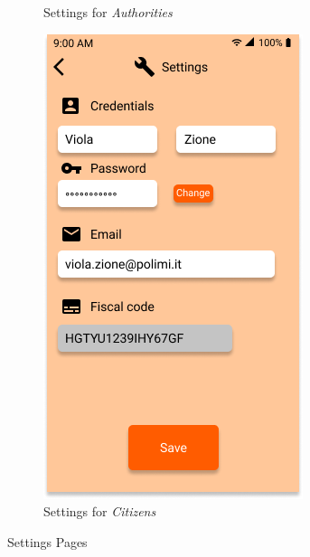 \documentclass{article}
\begin{document}
\begin{figure}[H]
\begin{subfigure}{0.5\textwidth}
        \caption{Settings for \textit{Authorities}}
        \label{fig:subim1}
    \end{subfigure}
    \begin{subfigure}{0.5\textwidth}
        \includegraphics[width=0.9\linewidth]{img/mockups/settings_citizen.png}
        \caption{Settings for \textit{Citizens}}
        \label{fig:subim2}
    \end{subfigure}
    \caption{Settings Pages}
    \label{fig:image2}
\end{figure}

\clearpage
\end{document}
